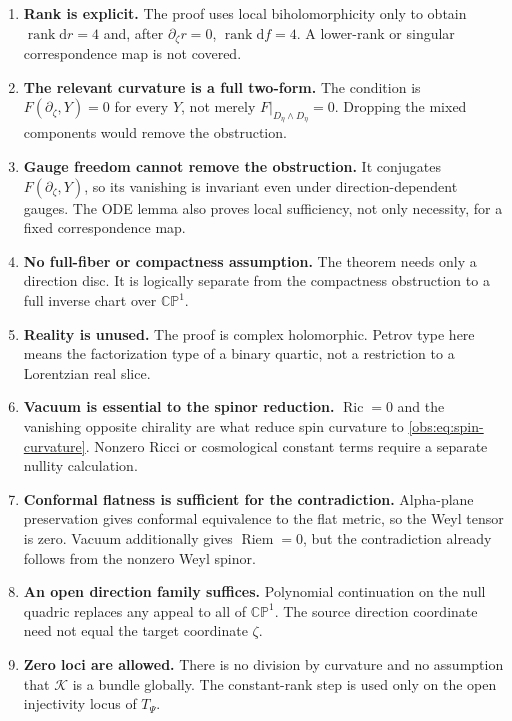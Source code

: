 \documentclass[11pt]{article}
\theoremstyle{definition}
\theoremstyle{remark}
\newcommand{\CP}{\mathbb{CP}}
\newcommand{\Ric}{\operatorname{Ric}}
\newcommand{\Riem}{\operatorname{Riem}}
\newcommand{\dd}{\mathrm d}
\newcommand{\rank}{\operatorname{rank}}
\begin{document}
\begin{enumerate}[leftmargin=*,label=\arabic*.]
\item \textbf{Rank is explicit.}
The proof uses local biholomorphicity only to obtain
$\rank\dd r=4$ and, after $\partial_\zeta r=0$, $\rank\dd f=4$.
A lower-rank or singular correspondence map is not covered.

\item \textbf{The relevant curvature is a full two-form.}
The condition is $F(\partial_\zeta,Y)=0$ for every $Y$, not merely
$F|_{D_\eta\wedge D_\eta}=0$. Dropping the mixed components would remove
the obstruction.

\item \textbf{Gauge freedom cannot remove the obstruction.}
It conjugates $F(\partial_\zeta,Y)$, so its vanishing is invariant even
under direction-dependent gauges. The ODE lemma also proves local
sufficiency, not only necessity, for a fixed correspondence map.

\item \textbf{No full-fiber or compactness assumption.}
The theorem needs only a direction disc. It is logically separate from
the compactness obstruction to a full inverse chart over $\CP^1$.

\item \textbf{Reality is unused.}
The proof is complex holomorphic. Petrov type here means the factorization
type of a binary quartic, not a restriction to a Lorentzian real slice.

\item \textbf{Vacuum is essential to the spinor reduction.}
$\Ric=0$ and the vanishing opposite chirality are what reduce spin
curvature to \eqref{obs:eq:spin-curvature}. Nonzero Ricci or cosmological
constant terms require a separate nullity calculation.

\item \textbf{Conformal flatness is sufficient for the contradiction.}
Alpha-plane preservation gives conformal equivalence to the flat metric,
so the Weyl tensor is zero. Vacuum additionally gives $\Riem=0$, but the
contradiction already follows from the nonzero Weyl spinor.

\item \textbf{An open direction family suffices.}
Polynomial continuation on the null quadric replaces any appeal to all
of $\CP^1$. The source direction coordinate need not equal the target
coordinate $\zeta$.

\item \textbf{Zero loci are allowed.}
There is no division by curvature and no assumption that $\mathcal K$
is a bundle globally. The constant-rank step is used only on the open
injectivity locus of $T_\Psi$.


\end{enumerate}
\end{document}
